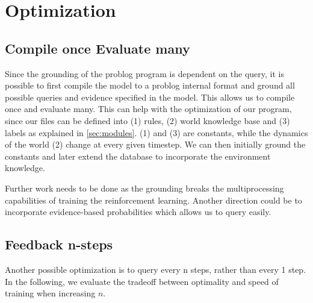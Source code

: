 \section{Optimization} \label{optimality} 



\subsection{Compile once Evaluate many}
Since the grounding of the problog program is dependent on the query, it is possible to first compile the model 
to a problog internal format and ground all possible queries and evidence specified in the model. This allows us 
to compile once and evaluate many. This can help with the optimization of our program, since our files can be defined into 
(1) rules, (2) world knowledge base and (3) labels as explained in \ref{sec:modules}. (1) and (3) are constants, while the dynamics 
of the world (2) change at every given timestep. We can then initially ground the constants and later 
extend the database to incorporate the environment knowledge. 
 
Further work needs to be done as the grounding breaks the multiprocessing capabilities of training the reinforcement learning. 
Another direction could be to incorporate evidence-based probabilities which allows us to query \dio{} easily.

\subsection{Feedback n-steps} 
Another possible optimization is to query \dio{} every n steps, rather than every 1 step. In the 
following, we evaluate the tradeoff between optimality and speed of training when increasing $n$. 


